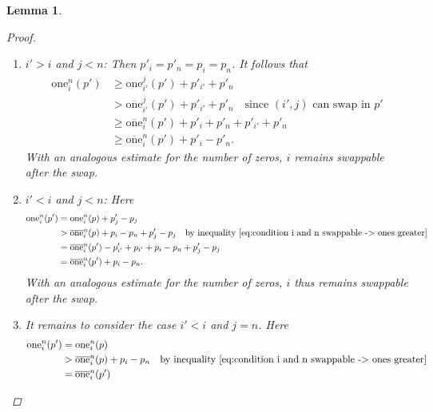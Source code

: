 \documentclass[12pt]{article}
\newtheorem{lem}[thm]{Lemma}
\begin{document}
\begin{lem}
\begin{proof}
\begin{enumerate}
\item
$i'>i$ and $j<n$: Then $p'_i = p'_n = p_i=p_n$. It follows that
\begin{align*}
\mathrm{one}_{i}^{n}(p')
&\geq
\mathrm{one}_{i'}^{j}(p')
+
p'_{i'}
+
p'_n
\\
&>
\overline{\mathrm{one}}_{i'}^{j}(p')
+
p'_{i'}
+
p'_n
\quad\textrm{since $(i', j)$ can swap in $p'$}
\\
&\geq
\overline{\mathrm{one}}_{i}^{n}(p')
+
p'_i
+
p'_n
+
p'_{i'}
+
p'_n
\\
&\geq
\overline{\mathrm{one}}_i^{n}(p')
+
p'_i-p'_n.
\end{align*}
With an analogous estimate for the number of zeros, $i$ remains swappable after the swap.

\item
$i'<i$ and $j<n$:
Here
\begin{align*}
\mathrm{one}_i^n(p')
&=
\mathrm{one}_i^n(p)
+ p'_j - p_j
\\
&> 
\overline{\mathrm{one}}_i^{n}(p)
 + p_i-p_n
 + p'_j - p_j
\quad \textrm{by inequality \eqref{eq:condition i and n swappable -> ones greater}}
\\
&=
\overline{\mathrm{one}}_i^n(p')
- p'_{i'} + p_{i'}
 + p_i-p_n
 + p'_j - p_j
\\
&=
\overline{\mathrm{one}}_i^n(p')
 + p_i-p_n.
\end{align*}
With an analogous estimate for the number of zeros, $i$ thus remains swappable after the swap.
\item It remains to consider the case $i'<i$ and $j=n$.
Here
\begin{align*}
\mathrm{one}_i^n(p')
&=
\mathrm{one}_i^n(p)
\\
&> 
\overline{\mathrm{one}}_i^{n}(p)
 + p_i-p_n
\quad \textrm{by inequality \eqref{eq:condition i and n swappable -> ones greater}}
\\
&=
\overline{\mathrm{one}}_i^n(p')

\end{align*}
\end{enumerate}
\end{proof}
\end{lem}
\end{document}
